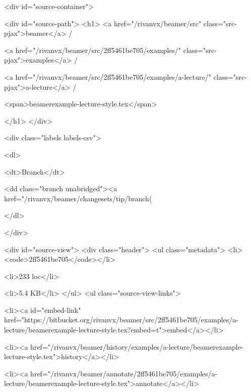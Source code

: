       
  <div id="source-container">
    

  <div id="source-path">
    <h1>
      <a href="/rivanvx/beamer/src" class="src-pjax">beamer</a> /

  
    
      <a href="/rivanvx/beamer/src/2ff5461be705/examples/" class="src-pjax">examples</a> /
    
  

  
    
      <a href="/rivanvx/beamer/src/2ff5461be705/examples/a-lecture/" class="src-pjax">a-lecture</a> /
    
  

  
    
      <span>beamerexample-lecture-style.tex</span>
    
  

    </h1>
  </div>

  <div class="labels labels-csv">
  
    <dl>
  
    
  
  
    
  
  
    <dt>Branch</dt>
    
      
        <dd class="branch unabridged"><a href="/rivanvx/beamer/changesets/tip/branch(%
      
    
  
</dl>

  
  </div>


  
  <div id="source-view">
    <div class="header">
      <ul class="metadata">
        <li><code>2ff5461be705</code></li>
        
          
            <li>233 loc</li>
          
        
        <li>5.4 KB</li>
      </ul>
      <ul class="source-view-links">
        
        <li><a id="embed-link" href="https://bitbucket.org/rivanvx/beamer/src/2ff5461be705/examples/a-lecture/beamerexample-lecture-style.tex?embed=t">embed</a></li>
        
        <li><a href="/rivanvx/beamer/history/examples/a-lecture/beamerexample-lecture-style.tex">history</a></li>
        
        <li><a href="/rivanvx/beamer/annotate/2ff5461be705/examples/a-lecture/beamerexample-lecture-style.tex">annotate</a></li>
        
